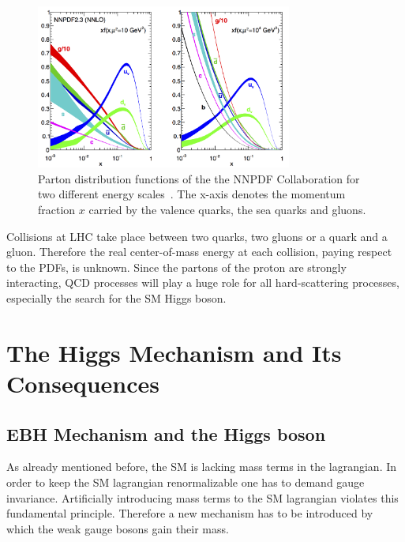 \begin{figure}[h!]
\vspace{-5ex}

\includegraphics[width=0.75\textwidth]{figures/nnpdf23_nnlo_allpdfs.png}
\caption[Parton distribution functions of the NNPDF Collaboration]{Parton distribution functions of the the NNPDF Collaboration for two different energy scales~\cite{NNPDF23}. The x-axis denotes the momentum fraction $x$
carried by the valence quarks, the sea quarks and gluons.}
\label{figure_parton_distribution_functions}

\end{figure}
Collisions at LHC take place between two quarks, two gluons or a quark and a gluon. Therefore the real center-of-mass energy at each
collision, paying respect to the PDFs, is unknown. Since the partons of the proton are strongly interacting, QCD processes will play a huge role
for all hard-scattering processes, especially the search for the SM Higgs boson.

\section{The Higgs Mechanism and Its Consequences}
\subsection{EBH Mechanism and the Higgs boson}


As already mentioned before, the SM is lacking mass terms in the lagrangian. In order to keep the SM lagrangian renormalizable one has
to demand gauge invariance. Artificially introducing mass terms to the SM lagrangian violates this fundamental principle. Therefore
a new mechanism has to be introduced by which the weak gauge bosons gain their mass.

